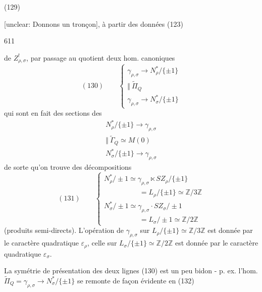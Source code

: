 \begin{enumerate}
(129)

[unclear: Donnons un tronçon], à partir des données (123)

\newpage


611

de $Z_{\rho,\sigma}^!$, par passage au quotient deux hom.
canoniques
$$ (130) \qquad \begin{cases} \gamma_{\rho,\sigma} \longrightarrow N_\rho^* / \{\pm 1\} \\ \Vert \ \tilde{\Pi}_Q \\ \gamma_{\rho,\sigma} \longrightarrow N_\sigma^* / \{\pm 1\} \end{cases} $$
qui sont en fait des sections des
$$ \begin{matrix} N_\rho^* / \{\pm 1\} \longrightarrow \gamma_{\rho,\sigma} \\ \Vert \ \tilde{\Gamma}_Q \simeq M(0) \\ N_\sigma^* / \{\pm 1\} \longrightarrow \gamma_{\rho,\sigma} \end{matrix} $$
de sorte qu'on trouve des décompositions
$$ (131) \qquad \begin{cases} N_\rho^* / \pm 1 \simeq \gamma_{\rho,\sigma} \ltimes S Z_\rho / \{\pm 1\} \\ \qquad \qquad \quad = L_\rho / \{\pm 1\} \simeq \mathbb{Z}/3\mathbb{Z} \\ N_\sigma^* / \pm 1 \simeq \gamma_{\rho,\sigma} \cdot S Z_\sigma / \pm 1 \\ \qquad \qquad \quad = L_\sigma / \pm 1 \simeq \mathbb{Z}/2\mathbb{Z} \end{cases} $$
(produits semi-directs). L'opération de
$\gamma_{\rho,\sigma}$ sur $L_\rho / \{\pm 1\} \simeq \mathbb{Z}/3\mathbb{Z}$ est donnée par le
caractère quadratique $\varepsilon_\rho$, celle sur $L_\sigma / \{\pm 1\} \simeq \mathbb{Z}/2\mathbb{Z}$
est donnée par le caractère quadratique $\varepsilon_\sigma$.

La symétrie de présentation des deux
lignes (130) est un peu bidon - p. ex.
l'hom. $\tilde{\Pi}_Q = \gamma_{\rho,\sigma} \longrightarrow N_\sigma^* / \{\pm 1\}$ se remonte
de façon évidente en
(132)


\end{enumerate}
